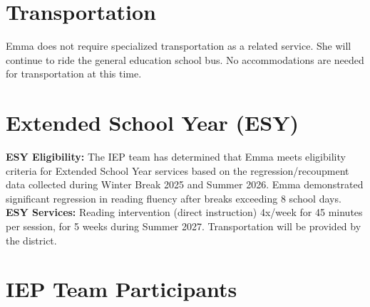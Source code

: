 \documentclass[11pt]{article}
\begin{document}
\vspace{8pt}

\section{Transportation}

\begin{iepbox}
Emma does not require specialized transportation as a related service. She will continue to ride the general education school bus. No accommodations are needed for transportation at this time.
\end{iepbox}

\section{Extended School Year (ESY)}

\begin{iepbox}
{\bfseries\color{IEPNavy} ESY Eligibility:} The IEP team has determined that Emma meets eligibility criteria for Extended School Year services based on the regression/recoupment data collected during Winter Break 2025 and Summer 2026. Emma demonstrated significant regression in reading fluency after breaks exceeding 8 school days.\\[4pt]
{\bfseries\color{IEPNavy} ESY Services:} Reading intervention (direct instruction) 4x/week for 45 minutes per session, for 5 weeks during Summer 2027. Transportation will be provided by the district.
\end{iepbox}

\vspace{10pt}

\section{IEP Team Participants}
\end{document}
